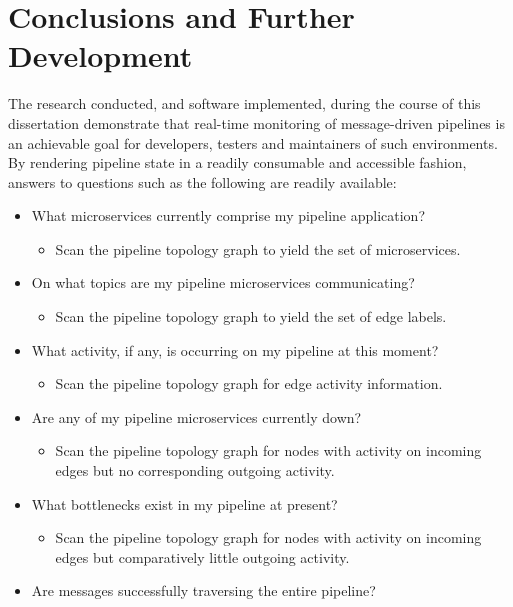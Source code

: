 \chapter{Conclusions and  Further Development}

The research conducted, and software implemented, during the course of this dissertation demonstrate that real-time monitoring of message-driven pipelines is an achievable goal for developers, testers and maintainers of such environments. By rendering pipeline state in a readily consumable and accessible fashion, answers to questions such as the following are readily available:


\begin{itemize}
	\item What microservices currently comprise my pipeline application?
		    \begin{itemize}
		    	\item Scan the pipeline topology graph to yield the set of microservices.
		    \end{itemize}
	\item On what topics are my pipeline microservices communicating?
	 	\begin{itemize}
			\item Scan the pipeline topology graph to yield the set of edge labels.
		\end{itemize}
	\item What activity, if any, is occurring on my pipeline at this moment?
	 	\begin{itemize}
			\item Scan the pipeline topology graph for edge activity information.
		\end{itemize}
	\item Are any of my pipeline microservices currently down?
		\begin{itemize}
			\item Scan the pipeline topology graph for nodes with activity on incoming edges but no corresponding outgoing activity.
		\end{itemize}
	\item What bottlenecks exist in my pipeline at present?
			\begin{itemize}
				\item Scan the pipeline topology graph for nodes with activity on incoming edges but comparatively little outgoing activity.
			\end{itemize}
    \item Are messages successfully traversing the entire pipeline?

\end{itemize}
